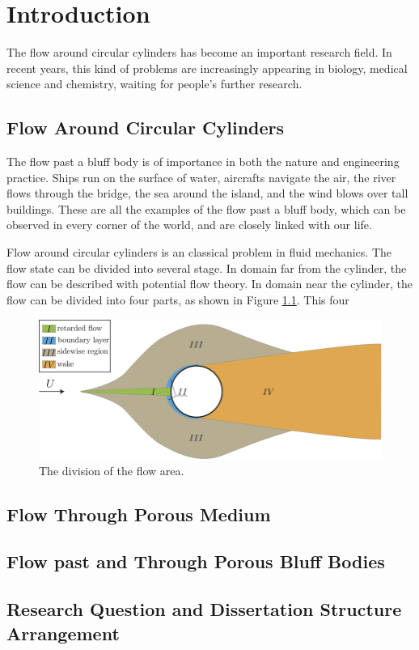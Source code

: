 \chapter{Introduction}
The flow around circular cylinders has become an important research field. In recent years, this kind of problems are increasingly appearing in biology, medical science and chemistry, waiting for people's further research.


\section{Flow Around Circular Cylinders}
The flow past a bluff body is of importance in both the nature and engineering practice. Ships run on the surface of water, aircrafts navigate the air, the river flows through the bridge, the sea around the island, and the wind blows over tall buildings. These are all the examples of the flow past a bluff body, which can be observed in every corner of the world, and are closely linked with our life.

Flow around circular cylinders is an classical problem in fluid mechanics. The flow state can be divided into several stage\cite{zdravkovich1997flow}. In domain far from the cylinder, the flow can be described with potential flow theory. In domain near the cylinder, the flow can be divided into four parts, as shown in Figure \ref{fig: flow area}. This four 
\begin{figure}
	\centering
	\includegraphics[scale=.4]{figs/Regions-of-disturbed-flow-around-a-perfect-circular-cylinder}
	\caption{The division of the flow area.}\label{fig: flow area}
\end{figure}


\section{Flow Through Porous Medium}
\section{Flow past and Through Porous Bluff Bodies}
\section{Research Question and Dissertation Structure Arrangement}
